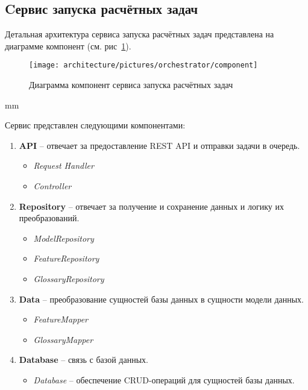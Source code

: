 \subsection{\large{Cервис запуска расчётных задач}}

Детальная архитектура сервиса запуска расчётных задач представлена на диаграмме компонент
(см. рис\ \ref{pic:architecture__orchestrator-component}).

\begin{figure}[H]
	\hspace*{-2.5 cm}\texttt{[image: architecture/pictures/orchestrator/component]}
	\caption{Диаграмма компонент сервиса запуска расчётных задач}
	\label{pic:architecture__orchestrator-component}
\end{figure}
 mm

Сервис представлен следующими компонентами:
\begin{enumerate}
	\item {
		\textbf{API} -- отвечает за предоставление REST API и отправки задачи в очередь.
		\begin{itemize}
			\item \textit{Request Handler}
			\item \textit{Controller}
		\end{itemize}
	}
	\item {
		\textbf{Repository} -- отвечает за получение и сохранение данных и логику их преобразований.
		\begin{itemize}
			\item \textit{ModelRepository}
			\item \textit{FeatureRepository}
			\item \textit{GlossaryRepository}
		\end{itemize}
	}
	\item {
		\textbf{Data} -- преобразование сущностей базы данных в сущности модели данных.
		\begin{itemize}
			\item \textit{FeatureMapper}
			\item \textit{GlossaryMapper}
		\end{itemize}
	}
	\item {
		\textbf{Database} -- связь с базой данных.
		\begin{itemize}
			\item \textit{Database} -- обеспечение CRUD-операций для сущностей базы данных.
		\end{itemize}
	}
\end{enumerate}
